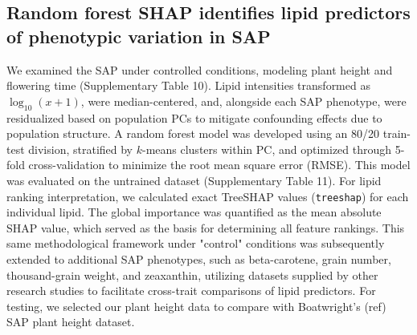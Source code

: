 \documentclass[10pt,letterpaper]{article}
\begin{document}
\begin{itemize}





\subsection*{Random forest SHAP identifies lipid predictors of phenotypic variation in SAP}
We examined the SAP under controlled conditions, modeling plant height and flowering time (Supplementary Table 10). Lipid intensities transformed as $\log_{10}(x+1)$, were median-centered, and, alongside each SAP phenotype, were residualized based on population PCs to mitigate confounding effects due to population structure. A random forest model was developed using an 80/20 train-test division, stratified by $k$-means clusters within PC, and optimized through 5-fold cross-validation to minimize the root mean square error (RMSE). This model was evaluated on the untrained dataset (Supplementary Table 11). For lipid ranking interpretation, we calculated exact TreeSHAP values (\texttt{treeshap}) for each individual lipid. The global importance was quantified as the mean absolute SHAP value, which served as the basis for determining all feature rankings. This same methodological framework under "control" conditions was subsequently extended to additional SAP phenotypes, such as  beta-carotene, grain number, thousand-grain weight, and zeaxanthin, utilizing datasets supplied by other research studies to facilitate cross-trait comparisons of lipid predictors. For testing, we selected our plant height data to compare with Boatwright's (ref) SAP plant height dataset. 


\end{itemize}
\end{document}
